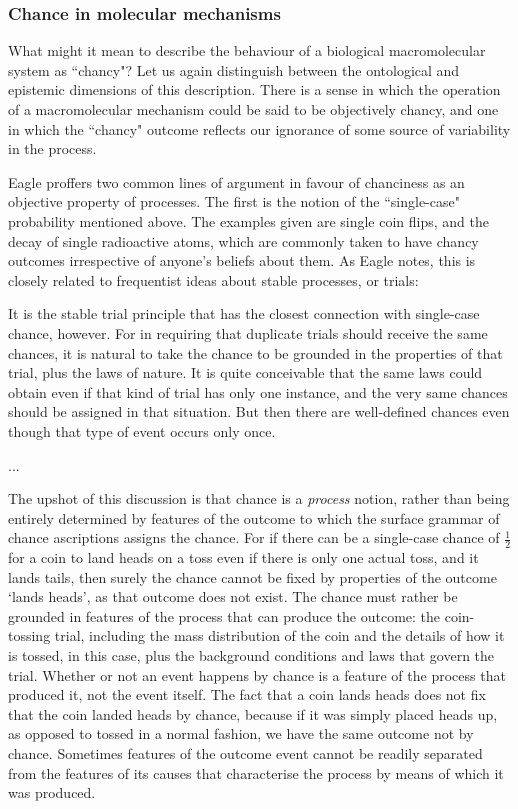 \subsubsection{Chance in molecular mechanisms}
What might it mean to describe the behaviour of a biological macromolecular system as ``chancy"? Let us again distinguish between the ontological and epistemic dimensions of this description. There is a sense in which the operation of a macromolecular mechanism could be said to be objectively chancy, and one in which the ``chancy" outcome reflects our ignorance of some source of variability in the process.

Eagle proffers two common lines of argument in favour of chanciness as an objective property of processes. The first is the notion of the ``single-case" probability mentioned above. The examples given are single coin flips, and the decay of single radioactive atoms, which are commonly taken to have chancy outcomes irrespective of anyone's beliefs about them. As Eagle notes, this is closely related to frequentist ideas about stable processes, or trials:

\begin{longquote}
It is the stable trial principle that has the closest connection with single-case chance, however. For in requiring that duplicate trials should receive the same chances, it is natural to take the chance to be grounded in the properties of that trial, plus the laws of nature. It is quite conceivable that the same laws could obtain even if that kind of trial has only one instance, and the very same chances should be assigned in that situation. But then there are well-defined chances even though that type of event occurs only once.

...

The upshot of this discussion is that chance is a \textit{process} notion, rather than being entirely determined by features of the outcome to which the surface grammar of chance ascriptions assigns the chance. For if there can be a single-case chance of $\frac{1}{2}$
for a coin to land heads on a toss even if there is only one actual toss, and it lands tails, then surely the chance cannot be fixed by properties of the outcome ‘lands heads’, as that outcome does not exist. The chance must rather be grounded in features of the process that can produce the outcome: the coin-tossing trial, including the mass distribution of the coin and the details of how it is tossed, in this case, plus the background conditions and laws that govern the trial. Whether or not an event happens by chance is a feature of the process that produced it, not the event itself. The fact that a coin lands heads does not fix that the coin landed heads by chance, because if it was simply placed heads up, as opposed to tossed in a normal fashion, we have the same outcome not by chance. Sometimes features of the outcome event cannot be readily separated from the features of its causes that characterise the process by means of which it was produced. 

\cite{Eagle2018}
\end{longquote}

